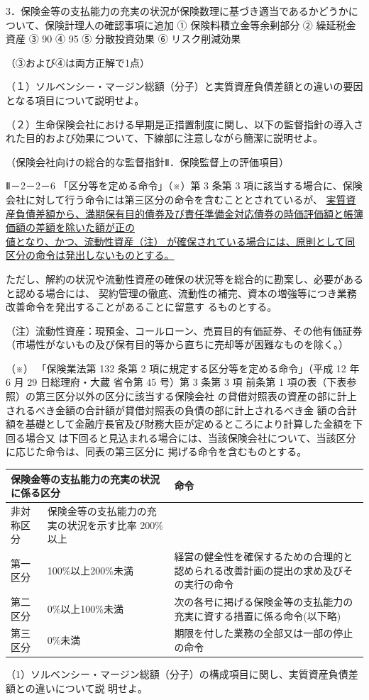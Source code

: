 \documentclass[report,gutter=10mm,fore-edge=10mm,uplatex,dvipdfmx]{jlreq}
\begin{document}
3．保険金等の支払能力の充実の状況が保険数理に基づき適当であるかどうかについて、保険計理人の確認事項に追加
\answer{}
① 保険料積立金等余剰部分 
② 繰延税金資産  
③ 90 
④ 95 
⑤ 分散投資効果 
⑥ リスク削減効果 

（③および④は両方正解で1点）

（１）ソルベンシー・マージン総額（分子）と実質資産負債差額との違いの要因となる項目について説明せよ。

（２）生命保険会社における早期是正措置制度に関し、以下の監督指針の導入された目的および効果について、下線部に注意しながら簡潔に説明せよ。

\begin{framed}
（保険会社向けの総合的な監督指針Ⅱ．保険監督上の評価項目）

 Ⅱ－2－2－6 「区分等を定める命令」（※）第 3 条第 3 項に該当する場合に、保険会社に対して行う命令には第三区分の命令を含むこととされているが、
 \underline{実質資産負債差額から、満期保有目的債券及び責任準備金対応債券の時価評価額と帳簿価額の差額を除いた額が正の\\}
\underline{値となり、かつ、流動性資産（注）
が確保されている場合には、原則として同区分の命令は発出しないものとする。}

ただし、解約の状況や流動性資産の確保の状況等を総合的に勘案し、必要があると認める場合には、
契約管理の徹底、流動性の補完、資本の増強等につき業務改善命令を発出することがあることに留意す
るものとする。

（注）流動性資産：現預金、コールローン、売買目的有価証券、その他有価証券（市場性がないもの及び保有目的等から直ちに売却等が困難なものを除く。）
\end{framed}

（※）
「保険業法第 132 条第 2 項に規定する区分等を定める命令」（平成 12 年 6 月 29 日総理府・大蔵
省令第 45 号）第 3 条第 3 項 前条第 1 項の表（下表参照）の第三区分以外の区分に該当する保険会社
の貸借対照表の資産の部に計上されるべき金額の合計額が貸借対照表の負債の部に計上されるべき金
額の合計額を基礎として金融庁長官及び財務大臣が定めるところにより計算した金額を下回る場合又
は下回ると見込まれる場合には、当該保険会社について、当該区分に応じた命令は、同表の第三区分に
掲げる命令を含むものとする。
\begin{tabularx}{\textwidth}{|l|X|X|}
\hline
 \multicolumn{2}{|l|}{保険金等の支払能力の充実の状況に係る区分} & 命令 \\ \hline
 非対称区分&保険金等の支払能力の充実の状況を示す比率 200\%以上& \\ \hline
第一区分& 100\%以上200\%未満 &経営の健全性を確保するための合理的と認められる改善計画の提出の求め及びその実行の命令\\ \hline
 第二区分& 0\%以上100\%未満&次の各号に掲げる保険金等の支払能力の充実に資する措置に係る命令(以下略)\\ \hline
 第三区分& 0\%未満&期限を付した業務の全部又は一部の停止の命令\\ \hline
\end{tabularx}
\answer{}
（1）ソルベンシー・マージン総額（分子）の構成項目に関し、実質資産負債差額との違いについて説
明せよ。
\end{document}
